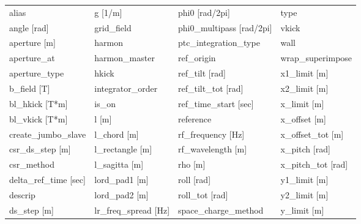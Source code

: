  \begin{tabular}{llll} \toprule
alias                            & g [1/m]                          & phi0 [rad/2pi]                   & type                             \\
angle [rad]                      & grid_field                       & phi0_multipass [rad/2pi]         & vkick                            \\
aperture [m]                     & harmon                           & ptc_integration_type             & wall                             \\
aperture_at                      & harmon_master                    & ref_origin                       & wrap_superimpose                 \\
aperture_type                    & hkick                            & ref_tilt [rad]                   & x1_limit [m]                     \\
b_field [T]                      & integrator_order                 & ref_tilt_tot [rad]               & x2_limit [m]                     \\
bl_hkick [T*m]                   & is_on                            & ref_time_start [sec]             & x_limit [m]                      \\
bl_vkick [T*m]                   & l [m]                            & reference                        & x_offset [m]                     \\
create_jumbo_slave               & l_chord [m]                      & rf_frequency [Hz]                & x_offset_tot [m]                 \\
csr_ds_step [m]                  & l_rectangle [m]                  & rf_wavelength [m]                & x_pitch [rad]                    \\
csr_method                       & l_sagitta [m]                    & rho [m]                          & x_pitch_tot [rad]                \\
delta_ref_time [sec]             & lord_pad1 [m]                    & roll [rad]                       & y1_limit [m]                     \\
descrip                          & lord_pad2 [m]                    & roll_tot [rad]                   & y2_limit [m]                     \\
ds_step [m]                      & lr_freq_spread [Hz]              & space_charge_method              & y_limit [m]                      \\

\end{tabular}
